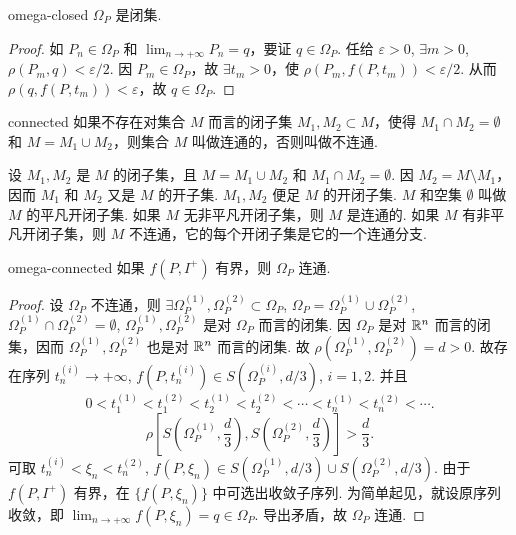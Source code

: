 \begin{theorem}{}{omega-closed}
$\Omega_P$ 是闭集.
\end{theorem}

\begin{proof}
如 $P_n \in \Omega_P$ 和 $\lim_{n \to +\infty} P_n = q$，要证 $q \in \Omega_P$. 任给 $\varepsilon > 0$, $\exists m > 0$, $\rho(P_m, q) < \varepsilon/2$. 因 $P_m \in \Omega_P$，故 $\exists t_m > 0$，使 $\rho(P_m, f(P, t_m)) < \varepsilon/2$. 从而 $\rho(q, f(P, t_m)) < \varepsilon$，故 $q \in \Omega_P$.
\end{proof}

\begin{definition}{}{connected}
如果不存在对集合 $M$ 而言的闭子集 $M_1, M_2 \subset M$，使得 $M_1 \cap M_2 = \emptyset$ 和 $M = M_1 \cup M_2$，则集合 $M$ 叫做连通的，否则叫做不连通.
\end{definition}

设 $M_1, M_2$ 是 $M$ 的闭子集，且 $M = M_1 \cup M_2$ 和 $M_1 \cap M_2 = \emptyset$. 因 $M_2 = M \setminus M_1$，因而 $M_1$ 和 $M_2$ 又是 $M$ 的开子集. $M_1, M_2$ 便足 $M$ 的开闭子集. $M$ 和空集 $\emptyset$ 叫做 $M$ 的平凡开闭子集. 如果 $M$ 无非平凡开闭子集，则 $M$ 是连通的. 如果 $M$ 有非平凡开闭子集，则 $M$ 不连通，它的每个开闭子集是它的一个连通分支.


\begin{theorem}{}{omega-connected}
如果 $f(P, I^+)$ 有界，则 $\Omega_P$ 连通.
\end{theorem}

\begin{proof}
设 $\Omega_P$ 不连通，则 $\exists \Omega_P^{(1)}, \Omega_P^{(2)} \subset \Omega_P$, $\Omega_P = \Omega_P^{(1)} \cup \Omega_P^{(2)}$, $\Omega_P^{(1)} \cap \Omega_P^{(2)} = \emptyset$, $\Omega_P^{(1)}, \Omega_P^{(2)}$ 是对 $\Omega_P$ 而言的闭集. 因 $\Omega_P$ 是对 $\mathbb{R}^n$ 而言的闭集，因而 $\Omega_P^{(1)}, \Omega_P^{(2)}$ 也是对 $\mathbb{R}^n$ 而言的闭集. 故 $\rho(\Omega_P^{(1)}, \Omega_P^{(2)}) = d > 0$. 故存在序列 $t_n^{(i)} \to +\infty$, $f(P, t_n^{(i)}) \in S(\Omega_P^{(i)}, d/3)$, $i = 1, 2$. 并且
\[
0 < t_1^{(1)} < t_1^{(2)} < t_2^{(1)} < t_2^{(2)} < \cdots < t_n^{(1)} < t_n^{(2)} < \cdots.
\]
\[
\rho\left[S\left(\Omega_P^{(1)}, \frac{d}{3}\right), S\left(\Omega_P^{(2)}, \frac{d}{3}\right)\right] > \frac{d}{3}.
\]
可取 $t_n^{(i)} < \xi_n < t_n^{(2)}$, $f(P, \xi_n) \in S(\Omega_P^{(1)}, d/3) \cup S(\Omega_P^{(2)}, d/3)$. 由于 $f(P, I^+)$ 有界，在 $\{f(P, \xi_n)\}$ 中可选出收敛子序列. 为简单起见，就设原序列收敛，即 $\lim_{n \to +\infty} f(P, \xi_n) = q \in \Omega_P$. 导出矛盾，故 $\Omega_P$ 连通.
\end{proof}

